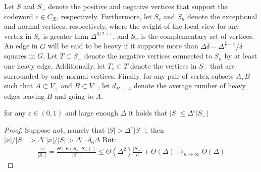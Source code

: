 \begin{definition}
Let $S$ and $S_{-}$ denote the positive and negative vertices that support the codeword $c \in C_{X}$, respectively. Furthermore, let $S_e$ and $S_n$ denote the exceptional and normal vertices, respectively, where the weight of the local view for any vertex in $S_e$ is greater than $\Delta^{3/2 + \varepsilon}$, and $S_n$ is the complementary set of vertices. An edge in $G$ will be said to be heavy if it supports more than $\Delta\delta - \Delta^{\frac{1}{2} + \varepsilon}/\delta$ squares in $G$. Let $T \subset S_{-}$ denote the negative vertices connected to $S_{n}$ by at least one heavy edge. Additionally, let $T_s \subset T$ denote the vertices in $S_-$ that are surrounded by only normal vertices. Finally, for any pair of vertex subsets $A,B$ such that $A \subset V_{+}$ and $B \subset V_{-}$, let $d_{B\rightarrow A}$ denote the average number of heavy edges leaving $B$ and going to $A$.
\end{definition}
\begin{claim}
  \label{claim:epss}
  for any $\varepsilon \in \left( 0,1 \right)$ and large enough $\Delta$  it holds that $ |S| \le \Delta^{\varepsilon}|S_{-}| $ 
\end{claim}
\begin{proof}
  Suppose not, namely that $|S| > \Delta^{\varepsilon}|S_{-}|$, then $|x|/|S_{-}| > \Delta^{\varepsilon}|x|/|S| > \Delta^{\varepsilon} \cdot \delta_{0}\Delta $ But:  
\begin{equation*}
  \begin{split}
    \frac{|x|}{|S_{-}|} = \frac{\Theta \left(E(S_{-},S_{-}) \right)}{|S_{-}|} \le \Theta(\Delta^{2})\frac{|S_{-}|}{n}  + \Theta(\Delta)  \rightarrow_{n\rightarrow \infty} \Theta(\Delta)
  \end{split}
\end{equation*}
\end{proof}

